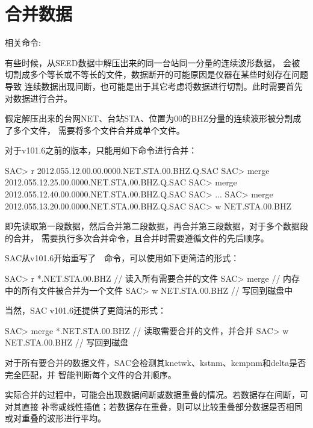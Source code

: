 \section{合并数据}
相关命令: 

有些时候，从SEED数据中解压出来的同一台站同一分量的连续波形数据，
会被切割成多个等长或不等长的文件，数据断开的可能原因是仪器在某些时刻存在问题导致
连续数据出现间断，也可能是出于其它考虑将数据进行切割。此时需要首先对数据进行合并。

假定解压出来的台网NET、台站STA、位置为00的BHZ分量的连续波形被分割成了多个文件，
需要将多个文件合并成单个文件。

对于v101.6之前的版本，只能用如下命令进行合并：
\begin{SACCode}
SAC> r 2012.055.12.00.00.0000.NET.STA.00.BHZ.Q.SAC
SAC> merge 2012.055.12.25.00.0000.NET.STA.00.BHZ.Q.SAC
SAC> merge 2012.055.12.40.00.0000.NET.STA.00.BHZ.Q.SAC
SAC> ...
SAC> merge 2012.055.13.20.00.0000.NET.STA.00.BHZ.Q.SAC
SAC> w NET.STA.00.BHZ
\end{SACCode}
即先读取第一段数据，然后合并第二段数据，再合并第三段数据，对于多个数据段的合并，
需要执行多次合并命令，且合并时需要遵循文件的先后顺序。

SAC从v101.6开始重写了~~命令，可以使用如下更简洁的形式：
\begin{SACCode}
SAC> r *.NET.STA.00.BHZ        // 读入所有需要合并的文件
SAC> merge                     // 内存中的所有文件被合并为一个文件
SAC> w NET.STA.00.BHZ          // 写回到磁盘中
\end{SACCode}

当然，SAC v101.6还提供了更简洁的形式：
\begin{SACCode}
SAC> merge *.NET.STA.00.BHZ     // 读取需要合并的文件，并合并
SAC> w NET.STA.00.BHZ           // 写回到磁盘
\end{SACCode}

对于所有要合并的数据文件，SAC会检测其knetwk、kstnm、kcmpnm和delta是否完全匹配，并
智能判断每个文件的合并顺序。

实际合并的过程中，可能会出现数据间断或数据重叠的情况。若数据存在间断，可对其直接
补零或线性插值；若数据存在重叠，则可以比较重叠部分数据是否相同或对重叠的波形进行平均。
